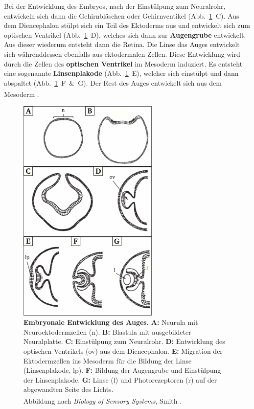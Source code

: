 Bei der Entwicklung des Embryos, nach der Einstülpung zum Neuralrohr, entwickeln sich dann die Gehirnbläschen oder Gehirnventikel (Abb.~\ref{fig:eye_neurulation}~C). Aus dem Diencephalon stülpt sich ein Teil des Ektoderms aus und entwickelt sich zum optischen Ventrikel (Abb.~\ref{fig:eye_neurulation}~D), welches sich dann zur \textbf{Augengrube}  entwickelt. Aus dieser wiederum entsteht dann die Retina. Die Linse das Auges entwickelt sich währenddessen ebenfalls aus ektodermalen Zellen. Diese Entwicklung wird durch die Zellen des \textbf{optischen Ventrikel}  im Mesoderm induziert. Es entsteht eine sogenannte \textbf{Linsenplakode}  (Abb.~\ref{fig:eye_neurulation}~E), welcher sich einstülpt und dann abspaltet (Abb.~\ref{fig:eye_neurulation}~F~\&~G). Der Rest des Auges entwickelt sich aus dem Mesoderm \textsuperscript{\cite[Kap.~16]{smith2008biology}}.

\begin{figure}[H]
    \centering
    \includegraphics{pictures/visual/Eye_Neurulation.png}
    \caption[Embryonale Entwicklung des Auges]{\textbf{Embryonale Entwicklung des Auges.} \textbf{A:} Neurula mit Neuroektodermzellen (n). \textbf{B:} Blastula mit ausgebildeter Neuralplatte. \textbf{C:} Einstülpung zum Neuralrohr. \textbf{D:} Entwicklung des optischen Ventrikels (ov) aus dem Diencephalon. \textbf{E:} Migration der Ektodermzellen ins Mesoderm für die Bildung der Linse (Linsenplakode, lp). \textbf{F:} Bildung der Augengrube und Einstülpung der Linsenplakode. \textbf{G:} Linse (l) und Photorezeptoren (r) auf der abgewandten Seite des Lichts.\\
    Abbildung nach \textit{Biology of Sensory Systems}, Smith \textsuperscript{\cite[Kap.~16]{smith2008biology}}.}
    \label{fig:eye_neurulation}
\end{figure}


